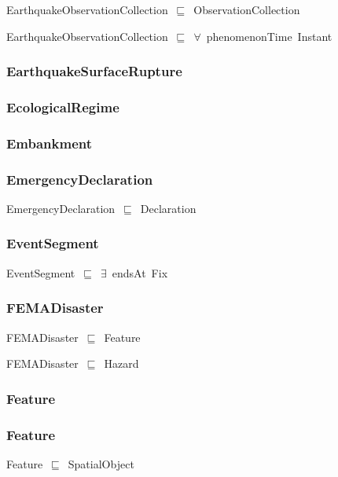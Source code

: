 \documentclass{article}
\begin{document}
EarthquakeObservationCollection~\ensuremath{\sqsubseteq}~ObservationCollection~

EarthquakeObservationCollection~\ensuremath{\sqsubseteq}~\ensuremath{\forall}~phenomenonTime~Instant~

\subsubsection*{EarthquakeSurfaceRupture}

\subsubsection*{EcologicalRegime}

\subsubsection*{Embankment}

\subsubsection*{EmergencyDeclaration}

EmergencyDeclaration~\ensuremath{\sqsubseteq}~Declaration~

\subsubsection*{EventSegment}

EventSegment~\ensuremath{\sqsubseteq}~\ensuremath{\exists}~endsAt~Fix~

\subsubsection*{FEMADisaster}

FEMADisaster~\ensuremath{\sqsubseteq}~Feature~

FEMADisaster~\ensuremath{\sqsubseteq}~Hazard~

\subsubsection*{Feature}

\subsubsection*{Feature}

Feature~\ensuremath{\sqsubseteq}~SpatialObject~
\end{document}
